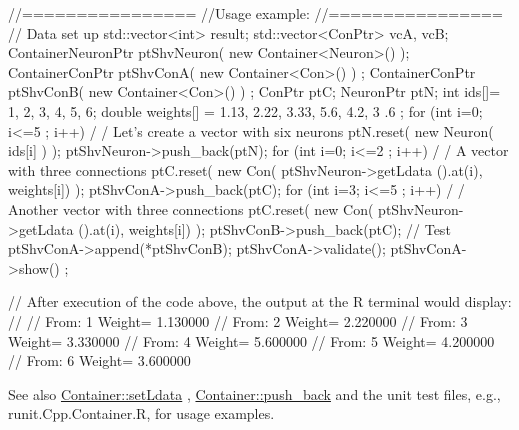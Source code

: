 \begin{DoxyCode}
        //================
        //Usage example:
        //================
        // Data set up
                                std::vector<int> result;
                                std::vector<ConPtr> vcA, vcB;
                                ContainerNeuronPtr      ptShvNeuron( new 
      Container<Neuron>() );
                                ContainerConPtr ptShvConA( new Container<Con>() )
      ;
                                ContainerConPtr ptShvConB( new Container<Con>() )
      ;
                                ConPtr  ptC;
                                NeuronPtr ptN;
                                int ids[]= {1, 2, 3, 4, 5, 6};
                                double weights[] = {1.13, 2.22, 3.33, 5.6, 4.2, 3
      .6 };
                                for (int i=0; i<=5 ; i++) {                             /
      / Let's create a vector with six neurons
                                        ptN.reset( new Neuron( ids[i] ) );
                                        ptShvNeuron->push_back(ptN);
                                }
                                for (int i=0; i<=2 ; i++) {                             /
      / A vector with three connections
                                        ptC.reset( new Con( ptShvNeuron->getLdata
      ().at(i), weights[i]) );
                                        ptShvConA->push_back(ptC);
                                }
                                for (int i=3; i<=5 ; i++) {                             /
      / Another vector with three connections
                                        ptC.reset( new Con( ptShvNeuron->getLdata
      ().at(i), weights[i]) );
                                        ptShvConB->push_back(ptC);
                                }
        // Test
                                ptShvConA->append(*ptShvConB);
                                ptShvConA->validate();
                                ptShvConA->show() ;

        // After execution of the code above, the output at the R terminal would 
      display:
        //
        //  From:        1       Weight=         1.130000
        //      From:    2       Weight=         2.220000
        //      From:    3       Weight=         3.330000
        //      From:    4       Weight=         5.600000
        //      From:    5       Weight=         4.200000
        //      From:    6       Weight=         3.600000
\end{DoxyCode}


\begin{DoxySeeAlso}{See also}
\hyperlink{class_container_a9ba632f4fc005eca7a7cb4c7616a7796}{Container::setLdata} , \hyperlink{class_container_afd87c69cb799ed7b434c29090083a285}{Container::push\_\-back} and the unit test files, e.g., runit.Cpp.Container.R, for usage examples. 
\end{DoxySeeAlso}


